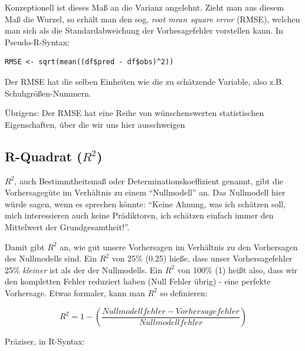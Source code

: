 \documentclass[12pt,]{book}
\newenvironment{Shaded}{\begin{snugshade}}{\end{snugshade}}
\newcommand{\KeywordTok}[1]{\textcolor[rgb]{0.13,0.29,0.53}{\textbf{{#1}}}}
\newcommand{\DecValTok}[1]{\textcolor[rgb]{0.00,0.00,0.81}{{#1}}}
\newcommand{\StringTok}[1]{\textcolor[rgb]{0.31,0.60,0.02}{{#1}}}
\newcommand{\NormalTok}[1]{{#1}}
\begin{document}
Konzeptionell ist dieses Maß an die Varianz angelehnt. Zieht man aus
diesem Maß die Wurzel, so erhält man den sog. \emph{root mean square
error} (RMSE), welchen man sich als die Standardabweichung der
Vorhesagefehler vorstellen kann. In Pseudo-R-Syntax:

\begin{verbatim}
RMSE <- sqrt(mean((df$pred - df$obs)^2))
\end{verbatim}

Der RMSE hat die selben Einheiten wie die zu schätzende Variable, also
z.B. Schuhgrößen-Nummern.

Übrigens: Der RMSE hat eine Reihe von wünschenswerten statistischen
Eigenschaften, über die wir uns hier ausschweigen

\subsection{\texorpdfstring{R-Quadrat
(\(R^2\))}{R-Quadrat (R\^{}2)}}\label{r-quadrat-r2}

\(R^2\), auch Bestimmtheitsmaß oder Determinationskoeffizient genannt,
gibt die Vorhersagegüte im Verhältnis zu einem ``Nullmodell'' an. Das
Nullmodell hier würde sagen, wenn es sprechen könnte: ``Keine Ahnung,
was ich schätzen soll, mich interessieren auch keine Prädiktoren, ich
schätzen einfach immer den Mittelwert der Grundgesamtheit!''.

Damit gibt \(R^2\) an, wie gut unsere Vorhersagen im Verhältnis zu den
Vorhersagen des Nullmodells sind. Ein \(R^2\) von 25\% (0.25) hieße,
dass unser Vorhersagefehler 25\% \emph{kleiner} ist als der der
Nullmodells. Ein \(R^2\) von 100\% (1) heißt also, dass wir den
kompletten Fehler reduziert haben (Null Fehler übrig) - eine perfekte
Vorhersage. Etwas formaler, kann man \(R^2\) so definieren:

\[ R^2 = 1 - (\frac{Nullmodellfehler - Vorhersagefehler}{Nullmodellfehler})\]

Präziser, in R-Syntax:

\begin{Shaded}
\end{Shaded}
\end{document}
